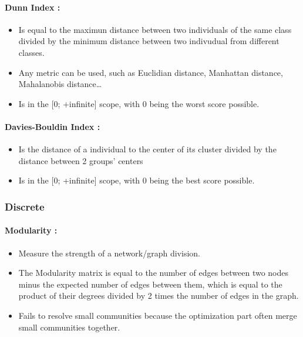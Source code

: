 \documentclass[11pt]{article}
\providecommand{\tightlist}{%
      \setlength{\itemsep}{0pt}\setlength{\parskip}{0pt}}
\begin{document}
    \hypertarget{dunn-index}{%
\paragraph{Dunn Index :}\label{dunn-index}}

    \begin{itemize}
\tightlist
\item
  Is equal to the maximun distance between two individuals of the same
  class divided by the minimum distance between two indivudual from
  different classes.
\item
  Any metric can be used, such as Euclidian distance, Manhattan
  distance, Mahalanobis distance\ldots{}
\item
  Is in the {[}0; +infinite{]} scope, with 0 being the worst score
  possible.
\end{itemize}

    \hypertarget{davies-bouldin-index}{%
\paragraph{Davies-Bouldin Index :}\label{davies-bouldin-index}}

    \begin{itemize}
\tightlist
\item
  Is the distance of a individual to the center of its cluster divided
  by the distance between 2 groups' centers
\item
  Is in the {[}0; +infinite{]} scope, with 0 being the best score
  possible.
\end{itemize}

    \hypertarget{discrete}{%
\subsubsection{Discrete}\label{discrete}}

    \hypertarget{modularity}{%
\paragraph{Modularity :}\label{modularity}}

    \begin{itemize}
\tightlist
\item
  Measure the strength of a network/graph division.
\item
  The Modularity matrix is equal to the number of edges between two
  nodes minus the expected number of edges between them, which is equal
  to the product of their degrees divided by 2 times the number of edges
  in the graph.
\item
  Fails to resolve small communities because the optimization part often
  merge small communities together.
\end{itemize}
\end{document}
